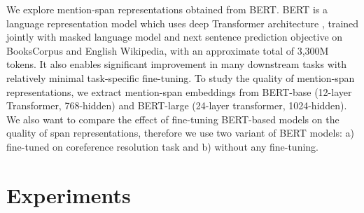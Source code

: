 \documentclass[11pt]{article}
\begin{document}
We explore mention-span representations obtained from BERT. BERT \parencite{devlin2019bert} is a language representation model which uses deep Transformer architecture \parencite{transformers}, trained jointly with masked language model and next sentence prediction objective on BooksCorpus \parencite{bookscorpus} and English Wikipedia, with an approximate total of 3,300M tokens. It also enables significant improvement in many downstream tasks with relatively minimal task-specific fine-tuning. To study the quality of mention-span representations, we extract mention-span embeddings from BERT-base (12-layer Transformer, 768-hidden) and BERT-large (24-layer transformer, 1024-hidden). We also want to compare the effect of fine-tuning BERT-based models on the quality of span representations, therefore we use two variant of BERT models: a) fine-tuned on coreference resolution task and b) without any fine-tuning.



\section{Experiments}


\end{document}
